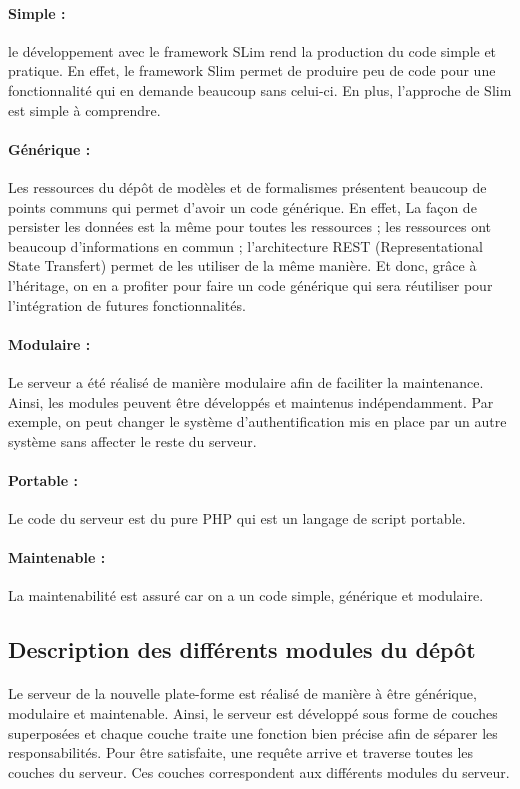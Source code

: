 \documentclass{report}
\begin{document}
\paragraph{Simple :}
le développement avec le framework SLim rend la production du code simple et pratique. En effet, le framework Slim permet
de produire peu de code pour une fonctionnalité qui en demande beaucoup sans celui-ci. En plus, l'approche de Slim est 
simple à comprendre.

\paragraph{Générique :}
Les ressources du dépôt de modèles et de formalismes présentent beaucoup de points communs qui permet d'avoir
un code générique. En effet, La façon de persister les données est la même pour toutes les ressources ; les ressources 
ont beaucoup d'informations en commun ; l'architecture REST (Representational State Transfert) permet de les utiliser de 
la même manière. Et donc, grâce à l'héritage, on en a profiter pour faire un code générique qui sera réutiliser pour l'intégration de futures fonctionnalités.

\paragraph{Modulaire :}
Le serveur a été réalisé de manière modulaire afin de faciliter la maintenance. Ainsi, les modules peuvent être développés
et maintenus indépendamment. Par exemple, on peut changer le système d'authentification mis en place par un autre
système sans affecter le reste du serveur.

\paragraph{Portable :}
Le code du serveur est du pure PHP qui est un langage de script portable.

\paragraph{Maintenable :}
La maintenabilité est assuré car on a un code simple, générique et modulaire.


\subsection{Description des différents modules du dépôt}

\paragraph{}
Le serveur de la nouvelle plate-forme est réalisé de manière à être générique, modulaire et maintenable. Ainsi, le serveur 
est développé sous forme de couches superposées et chaque couche traite une fonction bien précise afin de séparer
les responsabilités. Pour être satisfaite, une requête arrive et traverse toutes les couches du serveur. Ces couches correspondent aux différents modules du serveur. 
\end{document}

